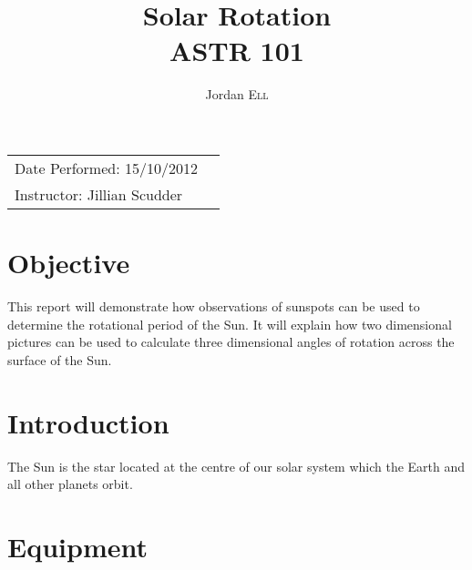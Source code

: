 \documentclass{article}
\title{Solar Rotation \\ ASTR 101} %
\author{Jordan \textsc{Ell}} %
\begin{document}
\maketitle %

\begin{tabular}{lr}
Date Performed: 15/10/2012\\ %
Instructor: Jillian Scudder %
\end{tabular}

\setlength\parindent{0pt} %

\renewcommand{\labelenumi}{\alph{enumi}.} %


\section{Objective}

This report will demonstrate how observations of sunspots can be used to determine the rotational period of the Sun. It will explain
how two dimensional pictures can be used to calculate three dimensional angles of rotation across the surface of the Sun.\\
 

\section{Introduction}

The Sun is the star located at the centre of our solar system which the Earth and all other planets orbit.\\


\section{Equipment}
\end{document}
